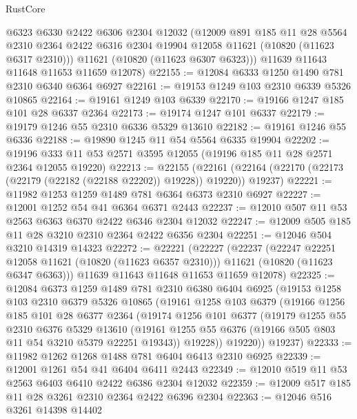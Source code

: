 \begin{lexlean}{RustCore}
\begin{coremodule}
        @6323
        @6330
        @2422
        @6306
        @2304
        @12032
        (@12009
          @891
          @185
          @11
          @28
          @5564
          @2310
          @2364
          @2422
          @6316
          @2304
          @19904
          @12058
          @11621
          (@10820 (@11623 @6317 @2310)))
        @11621
        (@10820 (@11623 @6307 @6323)))
      @11639
      @11643
      @11648
      @11653
      @11659
      @12078)
@22155 := @12084 @6333 @1250 @1490 @781 @2310 @6340 @6364 @6927
@22161 := @19153 @1249 @103 @2310 @6339 @5326 @10865
@22164 := @19161 @1249 @103 @6339
@22170 := @19166 @1247 @185 @101 @28 @6337 @2364
@22173 := @19174 @1247 @101 @6337
@22179 := @19179 @1246 @55 @2310 @6336 @5329 @13610
@22182 := @19161 @1246 @55 @6336
@22188 := @19890 @1245 @11 @54 @5564 @6335 @19904
@22202 := @19196 @333 @11 @53 @2571 @3595 @12055 (@19196 @185 @11 @28 @2571 @2364 @12055 @19220)
@22213 := @22155
    (@22161 (@22164 (@22170 (@22173 (@22179 (@22182 (@22188 @22202)) @19228)) @19220)) @19237)
@22221 := @11982 @1253 @1259 @1489 @781 @6364 @6373 @2310 @6927
@22227 := @12001 @1252 @54 @41 @6364 @6371 @2443
@22237 := @12010 @507 @11 @53 @2563 @6363 @6370 @2422 @6346 @2304 @12032
@22247 := @12009 @505 @185 @11 @28 @3210 @2310 @2364 @2422 @6356 @2304
@22251 := @12046 @504 @3210 @14319 @14323
@22272 := @22221
    (@22227
      (@22237
        (@22247 @22251 @12058 @11621 (@10820 (@11623 @6357 @2310)))
        @11621
        (@10820 (@11623 @6347 @6363)))
      @11639
      @11643
      @11648
      @11653
      @11659
      @12078)
@22325 := @12084
    @6373
    @1259
    @1489
    @781
    @2310
    @6380
    @6404
    @6925
    (@19153
      @1258
      @103
      @2310
      @6379
      @5326
      @10865
      (@19161
        @1258
        @103
        @6379
        (@19166
          @1256
          @185
          @101
          @28
          @6377
          @2364
          (@19174
            @1256
            @101
            @6377
            (@19179
              @1255
              @55
              @2310
              @6376
              @5329
              @13610
              (@19161 @1255 @55 @6376 (@19166 @505 @803 @11 @54 @3210 @5379 @22251 @19343))
              @19228))
          @19220))
      @19237)
@22333 := @11982 @1262 @1268 @1488 @781 @6404 @6413 @2310 @6925
@22339 := @12001 @1261 @54 @41 @6404 @6411 @2443
@22349 := @12010 @519 @11 @53 @2563 @6403 @6410 @2422 @6386 @2304 @12032
@22359 := @12009 @517 @185 @11 @28 @3261 @2310 @2364 @2422 @6396 @2304
@22363 := @12046 @516 @3261 @14398 @14402

\end{coremodule}
\end{lexlean}
